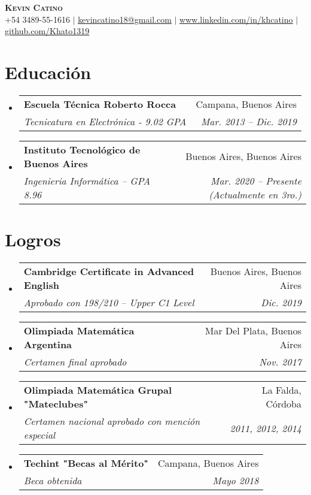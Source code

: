 \documentclass[letterpaper,11pt]{article}
\makeatletter
\newcommand{\resumeSubheading}[4]{
  \vspace{-2pt}\item
    \begin{tabular*}{0.97\textwidth}[t]{l@{\extracolsep{\fill}}r}
      \textbf{#1} & #2 \\
      \textit{\small#3} & \textit{\small #4} \\
    \end{tabular*}\vspace{-7pt}
}
\newcommand{\resumeSubHeadingListStart}{\begin{itemize}[leftmargin=0.15in, label={}]}
\newcommand{\resumeSubHeadingListEnd}{\end{itemize}}
\makeatother
\begin{document}

\begin{center}
    \textbf{\Huge \scshape Kevin Catino} \\ \vspace{1pt}
    \small +54 3489-55-1616 $|$ \href{mailto:x@x.com}{\underline{kevincatino18@gmail.com}} $|$ 
    \href{https://www.linkedin.com/in/khcatino}{\underline{www.linkedin.com/in/khcatino}} $|$
    \href{https://github.com/Khato1319}{\underline{github.com/Khato1319}}
\end{center}


\section{Educación}
  \resumeSubHeadingListStart
    \resumeSubheading
      {Escuela Técnica Roberto Rocca}{Campana, Buenos Aires}
      {Tecnicatura en Electrónica - 9.02 GPA}{Mar. 2013 -- Dic. 2019}
    \resumeSubheading
      {Instituto Tecnológico de Buenos Aires}{Buenos Aires, Buenos Aires}
      {Ingenieria Informática -- GPA 8.96}{Mar. 2020 -- Presente (Actualmente en 3ro.)}
  \resumeSubHeadingListEnd


\section{Logros}
\resumeSubHeadingListStart
\resumeSubheading
    {Cambridge Certificate in Advanced English}{Buenos Aires, Buenos Aires}
    {Aprobado con 198/210 -- Upper C1 Level}{Dic. 2019}
  \resumeSubheading
    {Olimpiada Matemática Argentina}{Mar Del Plata, Buenos Aires}
    {Certamen final aprobado}{Nov. 2017}
    \resumeSubheading
    {Olimpiada Matemática Grupal "Mateclubes"}{La Falda, Córdoba}
    {Certamen nacional aprobado con mención especial}{2011, 2012, 2014}
  \resumeSubheading
    {Techint "Becas al Mérito"}{Campana, Buenos Aires}
    {Beca obtenida}{Mayo 2018}
\resumeSubHeadingListEnd
\end{document}
